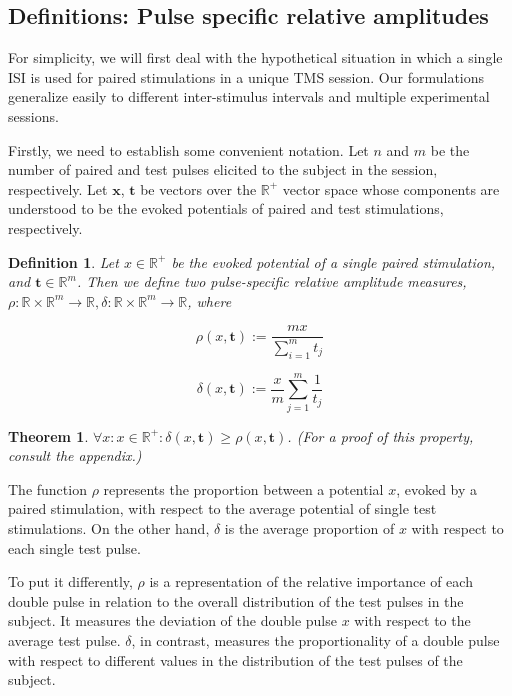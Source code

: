 \documentclass{article}
\newtheorem{definition}{Definition}
\newtheorem{theorem}{Theorem}
\begin{document}
\begin{multicols}{2}
\subsection{Definitions: Pulse specific relative amplitudes}

For simplicity, we will first deal with the hypothetical situation in which a
single ISI is used for paired stimulations in a unique TMS session. Our
formulations generalize easily to different inter-stimulus intervals and
multiple experimental sessions.

Firstly, we need to establish some convenient notation. Let $n$ and $m$ be the
number of paired and test pulses elicited to the subject in the session,
respectively. Let $\textbf{x}$, $\textbf{t}$ be vectors over the $\mathbb{R}^+$
vector space whose components are understood to be the evoked potentials of
paired and test stimulations, respectively.


\begin{definition} 

    Let $x \in \mathbb{R}^+$ be the evoked potential of a single paired
    stimulation, and $\textbf{t} \in \mathbb{R}^m$. Then we define two
    pulse-specific relative amplitude measures, $\rho : \mathbb{R} \times
    \mathbb{R}^m \to
    \mathbb{R}, \delta : \mathbb{R}\times \mathbb{R}^m \to \mathbb{R}$, where

    \begin{equation} 
        \rho(x, \textbf{t}) := \frac{mx}{\sum_{i=1}^mt_j}
    \end{equation}

    \begin{equation} 
        \delta(x, \textbf{t}) := \frac{x}{m}\sum_{j=1}^m\frac{1}{t_j} 
    \end{equation}
\end{definition}

\begin{theorem} 
    $\forall x: x \in \mathbb{R}^+:\delta(x, \textbf{t}) \geq \rho(x,
    \textbf{t})$. (For a proof of this property, consult the appendix.) 
\end{theorem}

The function $\rho$ represents the proportion between a potential $x$, evoked by
a paired stimulation, with respect to the average potential of single test
stimulations. On the other hand, $\delta$ is the average proportion of $x$
with respect to each single test pulse. 

To put it differently, $\rho$ is a representation of the relative importance of
each double pulse in relation to the overall distribution of the test pulses in
the subject. It measures the deviation of the double pulse $x$ with respect to
the average test pulse. $\delta$, in contrast, measures the proportionality of a
double pulse with respect to different values in the distribution of the test
pulses of the subject.


\end{multicols}
\end{document}
